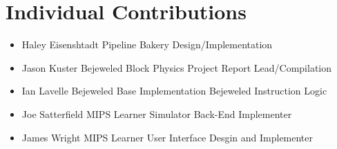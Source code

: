\documentclass[12pt]{article}
\begin{document}
	\section{Individual Contributions}
	\begin{itemize}
		\item Haley Eisenshtadt
		\subitem Pipeline Bakery Design/Implementation
		\item Jason Kuster
		\subitem Bejeweled Block Physics
		\subitem Project Report Lead/Compilation
		\item Ian Lavelle
		\subitem Bejeweled Base Implementation
		\subitem Bejeweled Instruction Logic
		\item Joe Satterfield
		\subitem MIPS Learner Simulator Back-End Implementer
		\item James Wright
		\subitem MIPS Learner User Interface Desgin and Implementer
	\end{itemize}
\end{document}
